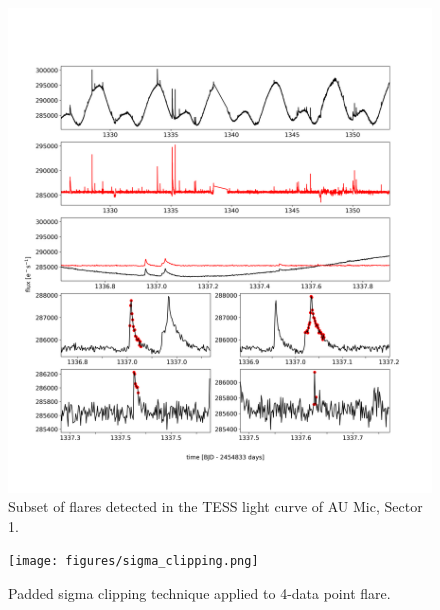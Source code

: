 \documentclass[fleqn,usenatbib,letters]{mnras}%
\begin{document}
\begin{figure}
\includegraphics[width=\hsize]{figures/aumic_illustrate_flares.png} 
\caption{Subset of flares detected in the TESS light curve of AU Mic, Sector 1.}
\label{fig:illustrate_detrend}
\end{figure}

\begin{figure}
\texttt{[image: figures/sigma\_clipping.png]} 
\caption{Padded sigma clipping technique applied to 4-data point flare.}
\label{fig:illustrate_clipping}
\end{figure}
\end{document}
